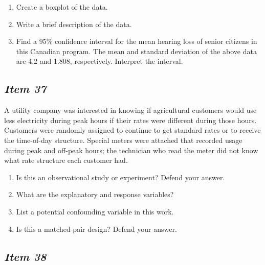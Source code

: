 \begin{enumerate}[leftmargin=1cm, itemsep=.2em]


\item Create a boxplot of the data.


\item Write a brief description of the data.


\item Find a 95\% confidence interval for the mean hearing loss of senior citizens in this Canadian program. The mean and standard deviation of the above data are 4.2 and 1.808, respectively. Interpret the interval.


\end{enumerate}





\subsection{\textbf{\textit{Item 37}}}


A utility company was interested in knowing if agricultural customers would use less electricity during peak hours if their rates were different during those hours. Customers were randomly assigned to continue to get standard rates or to receive the time-of-day structure. Special meters were attached that recorded usage during peak and off-peak hours; the technician who read the meter did not know what rate structure each customer had.


\begin{enumerate}[leftmargin=1cm, itemsep=.2em]


\item Is this an observational study or experiment? Defend your answer.


\item What are the explanatory and response variables?


\item List a potential confounding variable in this work.


\item Is this a matched-pair design? Defend your answer.


\end{enumerate}








\subsection{\textbf{\textit{Item 38}}}


